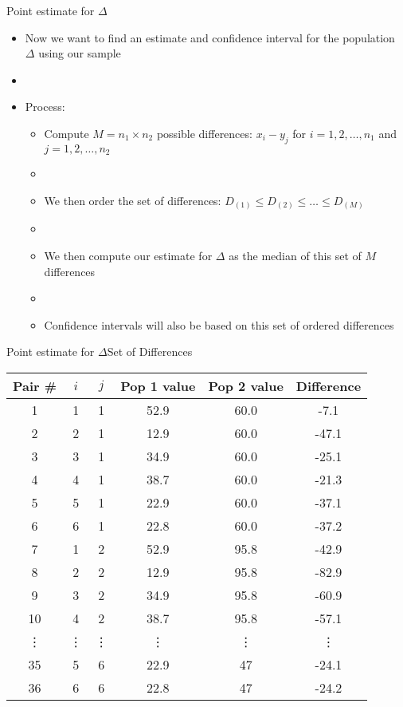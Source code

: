\documentclass[xcolor=dvipsnames]{beamer}
\begin{document}
\begin{frame}{Point estimate for $\Delta$}
	\begin{itemize}
		\item Now we want to find an estimate and confidence interval for the population $\Delta$ using our sample
		\item[]
		\item Process:
		\begin{itemize}
			\item Compute $M = n_1 \times n_2$ possible differences: $x_i - y_j$ for $i = 1, 2, \hdots, n_1$ and $j = 1, 2, \hdots, n_2$
			\item[]
			\item We then order the set of differences: $D_{(1)} \leq D_{(2)} \leq \hdots \leq D_{(M)}$
			\item[]
			\item We then compute our estimate for $\Delta$ as the median of this set of $M$ differences
			\item[]
			\item Confidence intervals will also be based on this set of ordered differences
 		\end{itemize}
	\end{itemize}
\end{frame}

\begin{frame}{Point estimate for $\Delta$}{Set of Differences}
	\begin{center}
		\begin{tabular}{|c|c|c|c|c|c|}
			\hline
	\textbf{Pair \#} & $i$ & $j$ & \textbf{Pop 1 value} & \textbf{Pop 2 value} & \textbf{Difference} \\ \hline \hline
			1 &    1  &  1 &   52.9  &  60.0  &  -7.1\\ \hline
			2 &   2  &  1  &  12.9  &  60.0  & -47.1\\ \hline
			3  &  3  &  1  &  34.9 &   60.0  & -25.1\\ \hline
			4 &   4  &  1  &  38.7  &  60.0  & -21.3\\ \hline
			5 &   5  &  1  &  22.9  &  60.0  & -37.1\\ \hline
			6 &   6  &  1  &  22.8  &  60.0  & -37.2\\ \hline
			7 &   1  &  2  &  52.9  &  95.8  & -42.9\\ \hline
			8 &   2  &  2  &  12.9  &  95.8  & -82.9\\ \hline
			9 &   3  &  2  &  34.9  &  95.8  & -60.9\\ \hline
			10 &  4  &  2  &  38.7  &  95.8  & -57.1\\ \hline
			\vdots &\vdots &\vdots &\vdots & \vdots & \vdots \\ \hline
			35  &    5   &   6   &   22.9   &     47  &   -24.1 \\ \hline
			36   &   6   &   6   &   22.8   &     47   &  -24.2 \\ \hline
		\end{tabular}
	\end{center}
\end{frame}
\end{document}
